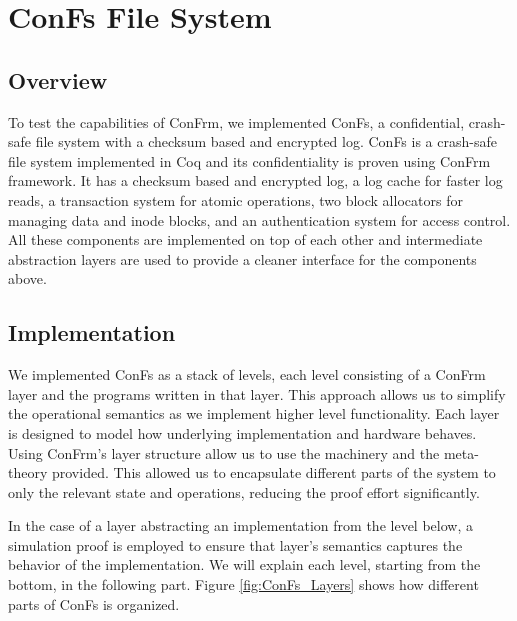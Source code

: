 \chapter{ConFs File System}
\label{chapter:ConFs}

\section{Overview}
To test the capabilities of ConFrm, we implemented ConFs, a confidential, crash-safe file system with a checksum based and encrypted log. 
ConFs is a crash-safe file system implemented in Coq and its confidentiality is proven using ConFrm framework. It has a checksum based and encrypted log, a log cache for faster log reads, a transaction system for atomic operations, two block allocators for managing data and inode blocks, and an authentication system for access control. All these components are implemented on top of each other and intermediate abstraction layers are used to provide a cleaner interface for the components above.

\section{Implementation}
We implemented ConFs as a stack of levels, each level consisting of a ConFrm layer and the programs written in that layer. This approach allows us to simplify the operational semantics as we implement higher level functionality. Each layer is designed to model how underlying implementation and hardware behaves. Using ConFrm's layer structure allow us to use the machinery and the meta-theory provided. This allowed us to encapsulate different parts of the system to only the relevant state and operations, reducing the proof effort significantly.

In the case of a layer abstracting an implementation from the level below, a simulation proof is employed to ensure that layer's semantics captures the behavior of the implementation. We will explain each level, starting from the bottom, in the following part. Figure \ref{fig:ConFs_Layers} shows how different parts of ConFs is organized.

